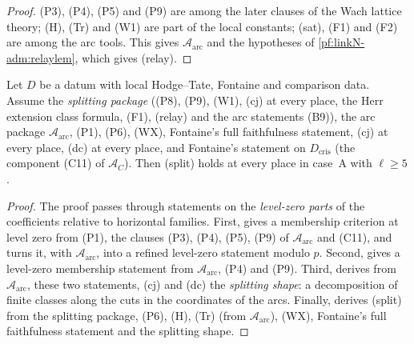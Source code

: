 \begin{proof}
(P3), (P4), (P5) and (P9) are among the later clauses of the Wach lattice theory; (H), (Tr) and (W1) are part of the local
constants; (sat), (F1) and (F2) are among the arc tools. This gives $\mathcal A_{\mathrm{arc}}$ and the hypotheses of
\cref{pf:linkN-adm:relaylem}, which gives (relay).
\end{proof}

\begin{proposition}\label{pf:linkN-adm:splitting}
Let $D$ be a datum with local Hodge--Tate, Fontaine and comparison data. Assume the \emph{splitting package} ((P8), (P9),
(W1), (cj) at every place, the Herr extension class formula, (F1), (relay) and the arc statements (B9)), the arc package
$\mathcal A_{\mathrm{arc}}$, (P1), (P6), (WX), Fontaine's full faithfulness statement, (cj) at every place, (dc) at every
place, and Fontaine's statement on $D_{\mathrm{cris}}$ (the component (C11) of $\mathcal A_C$). Then (split) holds at every
place in case~A with $\ell\ge5$.
\end{proposition}

\begin{proof}
The proof passes through statements on the \emph{level-zero parts} of the coefficients relative to horizontal families.
First,  gives a membership criterion at level zero from
(P1), the clauses (P3), (P4), (P5), (P9) of $\mathcal A_{\mathrm{arc}}$ and (C11), and
 turns it, with $\mathcal A_{\mathrm{arc}}$, into a refined
level-zero statement modulo $p$. Second,  gives a level-zero
membership statement from $\mathcal A_{\mathrm{arc}}$, (P4) and (P9). Third,
 derives from $\mathcal A_{\mathrm{arc}}$, these two
statements, (cj) and (dc) the \emph{splitting shape}: a decomposition of finite classes along the cuts in the coordinates of
the arcs. Finally,  derives (split) from the
splitting package, (P6), (H), (Tr) (from $\mathcal A_{\mathrm{arc}}$), (WX), Fontaine's full faithfulness statement and
the splitting shape.
\end{proof}

